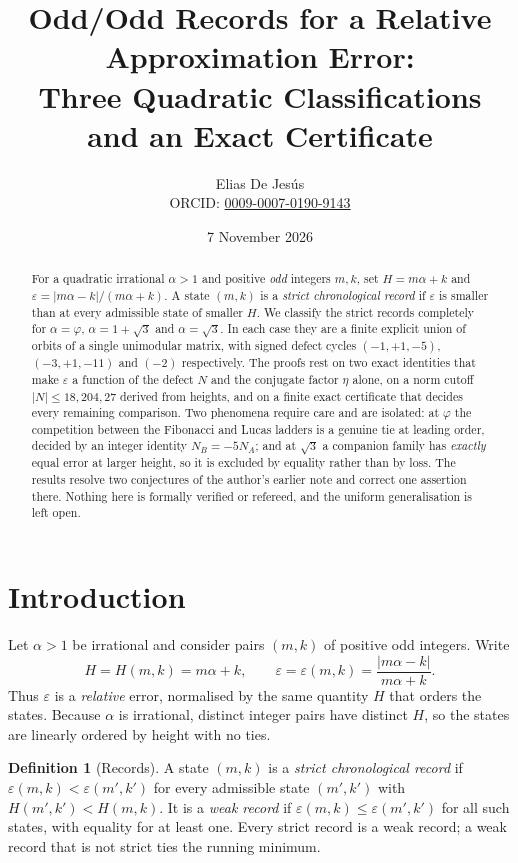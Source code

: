 \documentclass[11pt]{article}
\title{Odd/Odd Records for a Relative Approximation Error:\\
Three Quadratic Classifications and an Exact Certificate}
\author{Elias De Jes\'us\\
\small ORCID: \href{https://orcid.org/0009-0007-0190-9143}{0009-0007-0190-9143}}
\date{7 November 2026}
\theoremstyle{definition}
\newtheorem{definition}[theorem]{Definition}
\theoremstyle{remark}
\begin{document}
\maketitle

\begin{abstract}
For a quadratic irrational $\alpha>1$ and positive \emph{odd} integers $m,k$, set
$H=m\alpha+k$ and $\varepsilon=|m\alpha-k|/(m\alpha+k)$. A state $(m,k)$ is a
\emph{strict chronological record} if $\varepsilon$ is smaller than at every admissible state
of smaller $H$. We classify the strict records completely for $\alpha=\varphi$,
$\alpha=1+\sqrt3$ and $\alpha=\sqrt3$. In each case they are a finite explicit union of
orbits of a single unimodular matrix, with signed defect cycles $(-1,+1,-5)$, $(-3,+1,-11)$
and $(-2)$ respectively. The proofs rest on two exact identities that make $\varepsilon$ a
function of the defect $N$ and the conjugate factor $\eta$ alone, on a norm cutoff
$|N|\le 18,204,27$ derived from heights, and on a finite exact certificate that decides every
remaining comparison. Two phenomena require care and are isolated: at $\varphi$ the
competition between the Fibonacci and Lucas ladders is a genuine tie at leading order, decided
by an integer identity $N_B=-5N_A$; and at $\sqrt3$ a companion family has \emph{exactly}
equal error at larger height, so it is excluded by equality rather than by loss. The results
resolve two conjectures of the author's earlier note and correct one assertion there. Nothing
here is formally verified or refereed, and the uniform generalisation is left open.
\end{abstract}

\section{Introduction}\label{sec:intro}

Let $\alpha>1$ be irrational and consider pairs $(m,k)$ of positive odd integers. Write
\begin{equation}\label{eq:Heps}
H=H(m,k)=m\alpha+k,\qquad
\varepsilon=\varepsilon(m,k)=\frac{|m\alpha-k|}{m\alpha+k}.
\end{equation}
Thus $\varepsilon$ is a \emph{relative} error, normalised by the same quantity $H$ that orders
the states. Because $\alpha$ is irrational, distinct integer pairs have distinct $H$, so the
states are linearly ordered by height with no ties.

\begin{definition}[Records]\label{def:records}
A state $(m,k)$ is a \emph{strict chronological record} if
$\varepsilon(m,k)<\varepsilon(m',k')$ for every admissible state $(m',k')$ with $H(m',k')<H(m,k)$.
It is a \emph{weak record} if $\varepsilon(m,k)\le\varepsilon(m',k')$ for all such states, with
equality for at least one. Every strict record is a weak record; a weak record that is not
strict ties the running minimum.
\end{definition}
\end{document}
